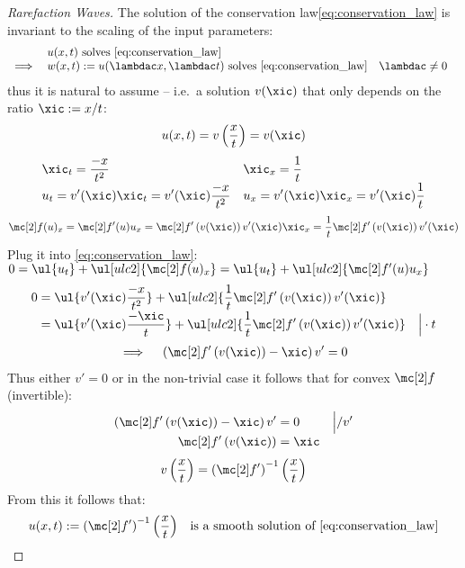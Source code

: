 \begin{proofbox}\nospacing
    \begin{proof}[Rarefaction Waves]\label{proof:rarefaction_waves}
        The solution of the conservation law\cref{eq:conservation_law} is invariant to the scaling of the input parameters:
        \begin{align*}
          &&&u(x,t)\text{ solves \cref{eq:conservation_law}}\\[-1\jot]
          &\implies&&w(x,t):=u(\lambdac x,\lambdac t)\text{ solves \cref{eq:conservation_law}}&&\lambdac\neq0
        \end{align*}
        thus it is natural to assume  -- i.e.\ a solution $v(\xic)$ that only depends on the ratio $\xic:=x/t$:
        \begin{align*}
          u(x,t)=v \left(\frac{x}{t}\right)=v(\xic)
        \end{align*}
        \begin{align*}
          &\xic_{t}=\frac{-x}{t^{2}}&&\xic_{x}=\frac{1}{t} \\[-1\jot]
          &u_{t}=v'(\xic)\xic_{t}=v'(\xic)\frac{-x}{t^{2}}&&u_{x}=v'(\xic)\xic_{x}=v'(\xic)\frac{1}{t}
        \end{align*}
        \begin{align*}
          \flux(u)_{x}=\flux'(u)u_{x}=\flux' \left(v(\xic)\right)v'(\xic)\xic_{x}
          =\frac{1}{t}\flux' \left(v(\xic)\right)v'(\xic)
        \end{align*}
        Plug it into \cref{eq:conservation_law}:\hfil $0=\ul{u_{t}}+\ul[ulc2]{\flux(u)_{x}}=\ul{u_{t}}+\ul[ulc2]{\flux'(u) u_{x}}$
        \begin{align*}
          0&=\ul{v'(\xic)\frac{-x}{t^{2}}}+\ul[ulc2]{\frac{1}{t}\flux'\left(v(\xic)\right)v'(\xic)} \\[-1\jot]
          &=\ul{v'(\xic)\frac{-\xic}{t}}+\ul[ulc2]{\frac{1}{t}\flux'\left(v(\xic)\right)v'(\xic)}&\Big|\cdot t
        \end{align*}
        \begin{align*}
          \implies\quad\left(\flux' \left(v(\xic)\right)-\xic\right)v'=0
        \end{align*}
        Thus either $v'=0$ or in the non-trivial case it follows that for convex $\flux$ (invertible):
        \begin{align*}
          \left(\flux' \left(v(\xic)\right)-\xic\right)v'&=0&&\Big|/v' \\[-1\jot]
          \flux' \left(v(\xic)\right)&=\xic
        \end{align*}
        \begin{align}
          v \left(\frac{x}{t}\right)=\left(\flux'\right)^{-1}\left(\frac{x}{t}\right)
        \end{align}
        From this it follows that:
        \begin{align*}
          u(x,t):=\left(\flux'\right)^{-1}\left(\frac{x}{t}\right) &&\text{is a smooth solution of \cref{eq:conservation_law}}
        \end{align*}
    \end{proof}
\end{proofbox}


